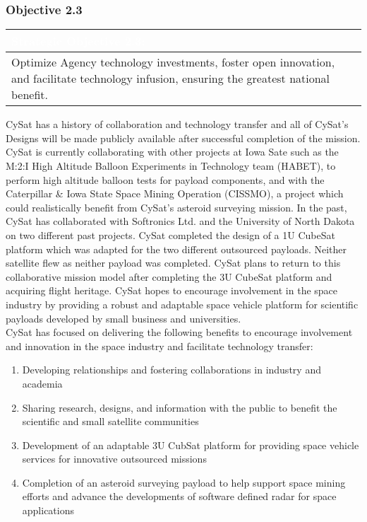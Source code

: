 \documentclass[nocover]            %
{CSLI}                       %
\begin{document}
\subsubsection{Objective 2.3}
\begin{table}[H]
\centering
\begin{tabular}{| p{\textwidth} |}
\arrayrulecolor{white}
\hline
\rowcolor{gray!80}
\textcolor{white}{\textbf{Strategic Objective 2.3: }} \\ \hline
\rowcolor{gray!10}
Optimize Agency technology investments, foster open innovation, and facilitate technology infusion, ensuring the greatest national benefit.\\ \hline
\end{tabular}
\end{table}
CySat has a history of collaboration and technology transfer and all of CySat's Designs will be made publicly available after successful completion of the mission. CySat is currently collaborating with other projects at Iowa Sate such as the M:2:I High Altitude Balloon Experiments in Technology team (HABET), to perform high altitude balloon tests for payload components, and with the Caterpillar \& Iowa State Space Mining Operation (CISSMO), a project which could realistically benefit from CySat's asteroid surveying mission. In the past, CySat has collaborated with Softronics Ltd. and the University of North Dakota on two different past projects. CySat completed the design of a 1U CubeSat platform which was adapted for the two different outsourced payloads. Neither satellite flew as neither payload was completed. CySat plans to return to this collaborative mission model after completing the 3U CubeSat platform and acquiring flight heritage. CySat hopes to encourage involvement in the space industry by providing a robust and adaptable space vehicle platform for scientific payloads developed by small business and universities.\\
\indent CySat has focused on delivering the following benefits to encourage involvement and innovation in the space industry and facilitate technology transfer:
\begin{enumerate}
\item{Developing relationships and fostering collaborations in industry and academia}
\item{Sharing research, designs, and information with the public to benefit the scientific and small satellite communities}
\item{Development of an adaptable 3U CubSat platform for providing space vehicle services for innovative outsourced missions}
\item{Completion of an asteroid surveying payload to help support space mining efforts and advance the developments of software defined radar for space applications}
\end{enumerate}
\end{document}

